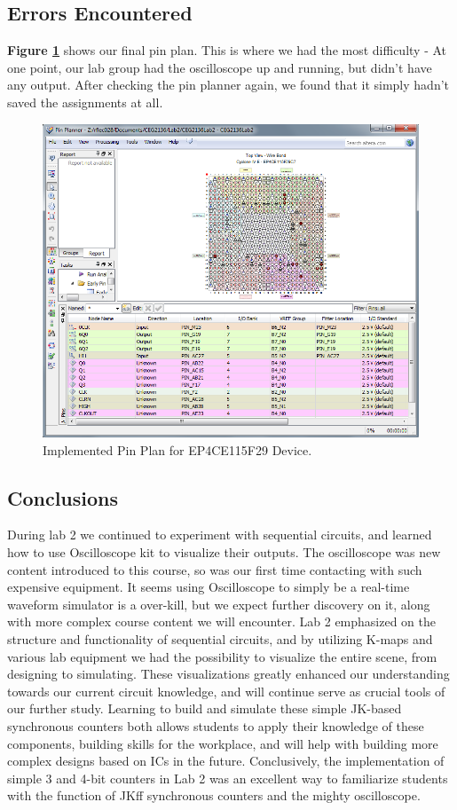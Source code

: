 \documentclass[a4paper,12pt]{article}
\begin{document}
\subsection{Errors Encountered}
\textbf{Figure \ref{fig:Uploaded}} shows our final pin plan. This is where we had the most difficulty - At one point, our lab group had the oscilloscope up and running, but didn't have any output. After checking the pin planner again, we found that it simply hadn't saved the assignments at all.
\begin{figure}[H]
\includegraphics[width=\textwidth]{Images/LAB2_PinAssignment.PNG} 
\caption{Implemented Pin Plan for EP4CE115F29 Device.}
\label{fig:Uploaded}
\end{figure}


\subsection{Conclusions}
During lab 2 we continued to experiment with sequential circuits, and learned how to use Oscilloscope kit to visualize their outputs. The oscilloscope was new content introduced to this course, so was our first time contacting with such expensive equipment. It seems using Oscilloscope to simply be a real-time waveform simulator is a over-kill, but we expect further discovery on it, along with more complex course content we will encounter. Lab 2 emphasized on the structure and functionality of sequential circuits, and by utilizing K-maps and various lab equipment we had the possibility to visualize the entire scene, from designing to simulating. These visualizations greatly enhanced our understanding towards our current circuit knowledge, and will continue serve as crucial tools of our further study. Learning to build and simulate these simple JK-based synchronous counters both allows students to apply their knowledge of these components, building skills for the workplace, and will help with building more complex designs based on ICs in the future. Conclusively, the implementation of simple 3 and 4-bit counters in Lab 2 was an excellent way to familiarize students with the function of JKff synchronous counters and the mighty oscilloscope.


\vspace*{\fill}
\end{document}
